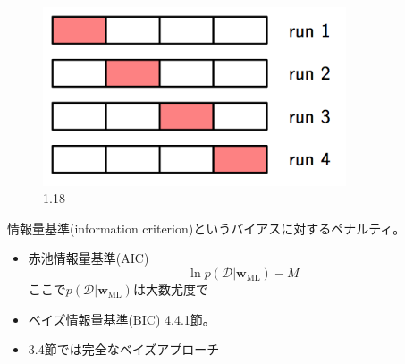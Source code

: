 \documentclass{jsarticle}
\def\w{{\bm{w}}}
\def\D{{\mathcal{D}}}
\begin{document}
\begin{figure}
  \centering
  \includegraphics[width=0.8\textwidth]{f1-18.png}
  \caption{1.18}
\end{figure}

情報量基準(information criterion)というバイアスに対するペナルティ。
\begin{itemize}
\item 赤池情報量基準(AIC)
  \[
  \ln p(\D | \w_{\mbox{ML}})-M
  \]
  ここで$p(\D | \w_{\mbox{ML}})$は大数尤度で
\item ベイズ情報量基準(BIC) 4.4.1節。
\item 3.4節では完全なベイズアプローチ
\end{itemize}
\end{document}

